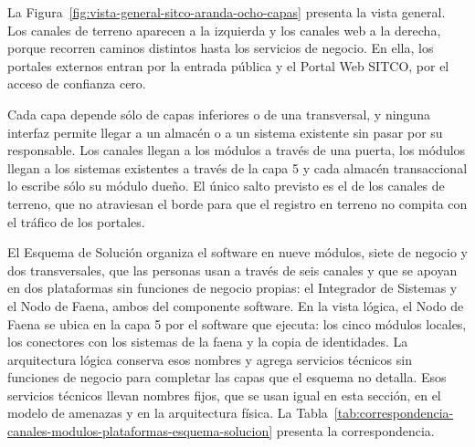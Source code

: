 \documentclass[subdoc]{../../comun/overfore}
\begin{document}
La Figura~\ref{fig:vista-general-sitco-aranda-ocho-capas} presenta la vista general. Los canales de terreno aparecen a la izquierda y los canales web a la derecha, porque recorren caminos distintos hasta los servicios de negocio. En ella, los portales externos entran por la entrada pública y el Portal Web SITCO, por el acceso de confianza cero.

Cada capa depende sólo de capas inferiores o de una transversal, y ninguna interfaz permite llegar a un almacén o a un sistema existente sin pasar por su responsable. Los canales llegan a los módulos a través de una puerta, los módulos llegan a los sistemas existentes a través de la capa 5 y cada almacén transaccional lo escribe sólo su módulo dueño. El único salto previsto es el de los canales de terreno, que no atraviesan el borde para que el registro en terreno no compita con el tráfico de los portales.

El Esquema de Solución organiza el software en nueve módulos, siete de negocio y dos transversales, que las personas usan a través de seis canales y que se apoyan en dos plataformas sin funciones de negocio propias: el Integrador de Sistemas y el Nodo de Faena, ambos del componente software. En la vista lógica, el Nodo de Faena se ubica en la capa 5 por el software que ejecuta: los cinco módulos locales, los conectores con los sistemas de la faena y la copia de identidades. La arquitectura lógica conserva esos nombres y agrega servicios técnicos sin funciones de negocio para completar las capas que el esquema no detalla. Esos servicios técnicos llevan nombres fijos, que se usan igual en esta sección, en el modelo de amenazas y en la arquitectura física. La Tabla~\ref{tab:correspondencia-canales-modulos-plataformas-esquema-solucion} presenta la correspondencia.
\end{document}

